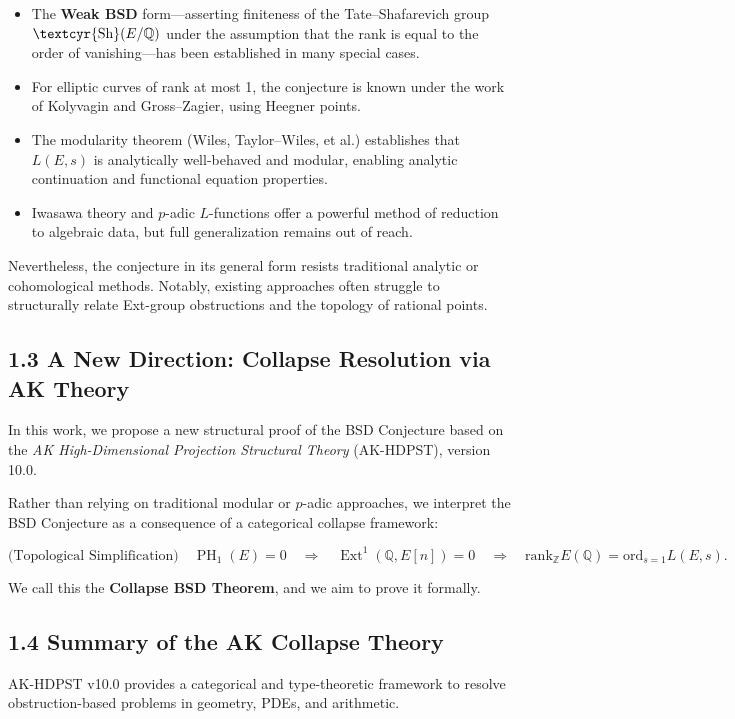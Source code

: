 \documentclass[11pt]{article}
\DeclareMathOperator{\Ext}{Ext}
\DeclareMathOperator{\PH}{PH}
\newcommand{\QQ}{\mathbb{Q}}
\newcommand{\ZZ}{\mathbb{Z}}
\newcommand{\Sha}{\text{\textcyr{Sh}}}
\begin{document}
\begin{itemize}
  \item The \textbf{Weak BSD} form—asserting finiteness of the Tate–Shafarevich group $\Sha(E/\QQ)$ under the assumption that the rank is equal to the order of vanishing—has been established in many special cases.
  \item For elliptic curves of rank at most 1, the conjecture is known under the work of Kolyvagin and Gross–Zagier, using Heegner points.
  \item The modularity theorem (Wiles, Taylor–Wiles, et al.) establishes that $L(E,s)$ is analytically well-behaved and modular, enabling analytic continuation and functional equation properties.
  \item Iwasawa theory and $p$-adic $L$-functions offer a powerful method of reduction to algebraic data, but full generalization remains out of reach.
\end{itemize}

Nevertheless, the conjecture in its general form resists traditional analytic or cohomological methods.  
Notably, existing approaches often struggle to structurally relate Ext-group obstructions and the topology of rational points.

\subsection{1.3 A New Direction: Collapse Resolution via AK Theory}

In this work, we propose a new structural proof of the BSD Conjecture based on the \emph{AK High-Dimensional Projection Structural Theory} (AK-HDPST), version 10.0.

Rather than relying on traditional modular or $p$-adic approaches, we interpret the BSD Conjecture as a consequence of a categorical collapse framework:

\[
\text{(Topological Simplification)} \quad \PH_1(E) = 0
\quad \Longrightarrow \quad
\Ext^1(\QQ,E[n]) = 0
\quad \Longrightarrow \quad
\mathrm{rank}_{\ZZ} E(\QQ) = \mathrm{ord}_{s=1} L(E,s).
\]

We call this the \textbf{Collapse BSD Theorem}, and we aim to prove it formally.

\subsection{1.4 Summary of the AK Collapse Theory}

AK-HDPST v10.0 provides a categorical and type-theoretic framework to resolve obstruction-based problems in geometry, PDEs, and arithmetic.
\end{document}
